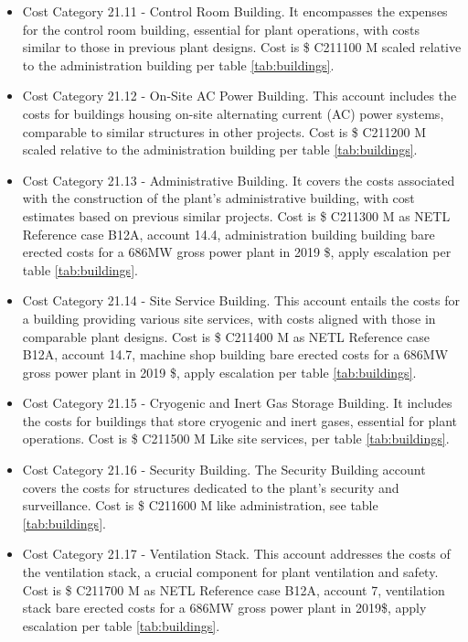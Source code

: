 \begin{itemize}
    \item Cost Category 21.11 - Control Room Building. It encompasses the expenses for the control room building, essential for plant operations, with costs similar to those in previous plant designs.  Cost is \$ C211100 M scaled relative to the administration building per table \ref{tab:buildings}.
    \item Cost Category 21.12 - On-Site AC Power Building. This account includes the costs for buildings housing on-site alternating current (AC) power systems, comparable to similar structures in other projects.  Cost is \$ C211200 M scaled relative to the administration building per table \ref{tab:buildings}.
    \item Cost Category 21.13 - Administrative Building. It covers the costs associated with the construction of the plant’s administrative building, with cost estimates based on previous similar projects. Cost is \$ C211300 M as NETL Reference case B12A, account 14.4, administration building building bare erected costs for a 686MW gross power plant in 2019 \$, apply escalation per table \ref{tab:buildings}.
    \item Cost Category 21.14 - Site Service Building. This account entails the costs for a building providing various site services, with costs aligned with those in comparable plant designs. Cost is \$ C211400 M as NETL Reference case B12A, account 14.7, machine shop building bare erected costs for a 686MW gross power plant in 2019 \$, apply escalation per table \ref{tab:buildings}.
    \item Cost Category 21.15 - Cryogenic and Inert Gas Storage Building. It includes the costs for buildings that store cryogenic and inert gases, essential for plant operations.  Cost is \$ C211500 M Like site services, per table \ref{tab:buildings}.
    \item Cost Category 21.16 - Security Building. The Security Building account covers the costs for structures dedicated to the plant’s security and surveillance. Cost is \$ C211600 M like administration, see table \ref{tab:buildings}.
    \item Cost Category 21.17 - Ventilation Stack. This account addresses the costs of the ventilation stack, a crucial component for plant ventilation and safety. Cost is \$ C211700 M as NETL Reference case B12A, account 7, ventilation stack bare erected costs for a 686MW gross power plant in 2019\$, apply escalation per table \ref{tab:buildings}.
\end{itemize}